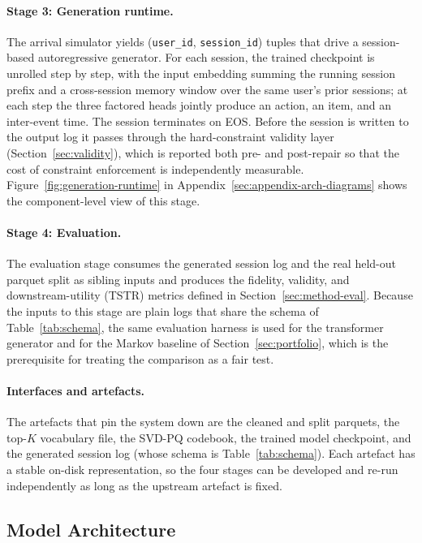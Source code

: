 \documentclass[sigconf,nonacm]{acmart}
\begin{document}
\paragraph{Stage 3: Generation runtime.}
The arrival simulator yields (\texttt{user\_id}, \texttt{session\_id})
tuples that drive a session-based autoregressive generator. For each
session, the trained checkpoint is unrolled step by step, with the input
embedding summing the running session prefix and a cross-session memory
window over the same user's prior sessions; at each step the three
factored heads jointly produce an action, an item, and an inter-event
time. The session terminates on EOS. Before the session is written to
the output log it passes through the hard-constraint validity layer
(Section~\ref{sec:validity}), which is reported both pre- and
post-repair so that the cost of constraint enforcement is independently
measurable. Figure~\ref{fig:generation-runtime} in
Appendix~\ref{sec:appendix-arch-diagrams} shows the component-level
view of this stage.

\paragraph{Stage 4: Evaluation.}
The evaluation stage consumes the generated session log and the real
held-out parquet split as sibling inputs and produces the fidelity,
validity, and downstream-utility (TSTR) metrics defined in
Section~\ref{sec:method-eval}. Because the inputs to this stage are
plain logs that share the schema of Table~\ref{tab:schema}, the same
evaluation harness is used for the transformer generator and for the
Markov baseline of Section~\ref{sec:portfolio}, which is the
prerequisite for treating the comparison as a fair test.

\paragraph{Interfaces and artefacts.}
The artefacts that pin the system down are the cleaned and split
parquets, the top-$K$ vocabulary file, the SVD-PQ codebook, the trained
model checkpoint, and the generated session log (whose schema is
Table~\ref{tab:schema}). Each artefact has a stable on-disk
representation, so the four stages can be developed and re-run
independently as long as the upstream artefact is fixed.

\subsection{Model Architecture}
\label{sec:model-arch}
\end{document}
